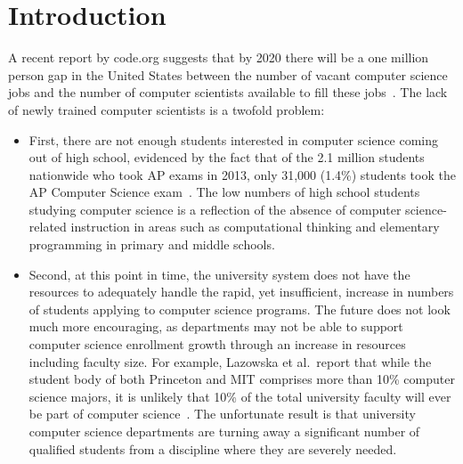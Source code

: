 \chapter{Introduction} \label{chap:introduction}
A recent report by code.org suggests that by 2020 there will be a one million
person gap in the United States between the number of vacant computer science
jobs and the number of computer scientists available to fill these
jobs~\cite{codeorg:2013}. The lack of newly trained computer scientists is a
twofold problem:

\begin{itemize}
\item First, there are not enough students interested in computer science
  coming out of high school, evidenced by the fact that of the 2.1 million
  students nationwide who took AP exams in 2013, only 31,000 (1.4\%) students
  took the AP Computer Science exam~\cite{cb:2013}. The low numbers of high
  school students studying computer science is a reflection of the absence of
  computer science-related instruction in areas such as computational thinking
  and elementary programming in primary and middle schools.
\item Second, at this point in time, the university system does not have the
  resources to adequately handle the rapid, yet insufficient, increase in
  numbers of students applying to computer science programs. The future does
  not look much more encouraging, as departments may not be able to support
  computer science enrollment growth through an increase in resources including
  faculty size. For example, Lazowska et al.\ report that while the student
  body of both Princeton and MIT comprises more than 10\% computer science
  majors, it is unlikely that 10\% of the total university faculty will ever be
  part of computer science~\cite{lazowska:2014}. The unfortunate result is that
  university computer science departments are turning away a significant number
  of qualified students from a discipline where they are severely needed.
\end{itemize}

